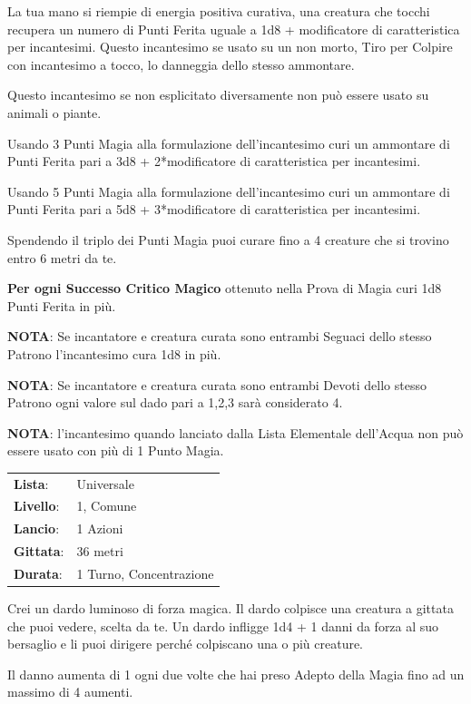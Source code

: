 \begin{multicols}{2}
La tua mano si riempie di energia positiva curativa, una creatura che tocchi recupera un numero di Punti Ferita uguale a 1d8 + modificatore di caratteristica per incantesimi. Questo incantesimo se usato su un non morto, Tiro per Colpire con incantesimo a tocco, lo danneggia dello stesso ammontare.

Questo incantesimo se non esplicitato diversamente non può essere usato su animali o piante.

Usando 3 Punti Magia alla formulazione dell'incantesimo curi un ammontare di Punti Ferita pari a 3d8 + 2*modificatore di caratteristica per incantesimi.

Usando 5 Punti Magia alla formulazione dell'incantesimo curi un ammontare di Punti Ferita pari a 5d8 + 3*modificatore di caratteristica per incantesimi.

Spendendo il triplo dei Punti Magia puoi curare fino a 4 creature che si trovino entro 6 metri da te.

\textbf{Per ogni Successo Critico Magico} ottenuto nella Prova di Magia curi 1d8 Punti Ferita in più.

\textbf{NOTA}: Se incantatore e creatura curata sono entrambi Seguaci dello stesso Patrono l'incantesimo cura 1d8 in più.

\textbf{NOTA}: Se incantatore e creatura curata sono entrambi Devoti dello stesso Patrono ogni valore sul dado pari a 1,2,3 sarà considerato 4.

\textbf{NOTA}: l'incantesimo quando lanciato dalla Lista Elementale dell'Acqua non può essere usato con più di 1 Punto Magia.

\noindent\begin{tabularx}{\linewidth}{p{1.3cm}X}
	\rowcolor{gray!20}\textbf{Lista}: & Universale \\
	\textbf{Livello}: & 1, Comune \\
	\rowcolor{gray!20}\textbf{Lancio}: & 1 Azioni \\
	\textbf{Gittata}: & 36 metri \\
	\rowcolor{gray!20}\textbf{Durata}: & 1 Turno, Concentrazione \\
\end{tabularx}\smallskip

Crei un dardo luminoso di forza magica. Il dardo colpisce una creatura a gittata che puoi vedere, scelta da te. Un dardo infligge 1d4 + 1 danni da forza al suo bersaglio e li puoi dirigere perché colpiscano una o più creature.

Il danno aumenta di 1 ogni due volte che hai preso Adepto della Magia fino ad un massimo di 4 aumenti.


\end{multicols}
